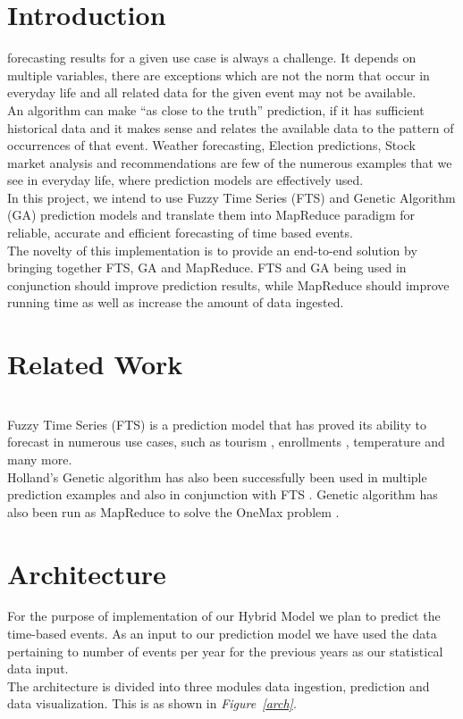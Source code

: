 \documentclass[12pt,journal,compsoc]{IEEEtran}
\begin{document}
\section{Introduction}
 forecasting results for a given use case is always a challenge. It depends on multiple variables, there are exceptions which are not the norm that occur in everyday life and all related data for the given event may not be available.
\\\indent An algorithm can make ``as close to the truth'' prediction, if it has sufficient historical data and  it makes sense and relates the available data to the pattern of occurrences of that event. Weather forecasting, Election predictions, Stock market analysis and recommendations are few of the numerous examples that we see in everyday life, where prediction models are effectively used.
\\\indent In this project, we intend to use Fuzzy Time Series (FTS) \cite{FTS} and Genetic Algorithm (GA) \cite{GA}  prediction models and translate them into MapReduce paradigm for reliable, accurate and efficient forecasting of time based events.  
\\\indent The novelty of this implementation is to provide an end-to-end solution by bringing together FTS, GA and MapReduce. FTS and GA being used in conjunction should improve prediction results, while MapReduce should improve running time as well as increase the amount of data ingested.


\section{Related Work}
\\\indent Fuzzy Time Series (FTS) \cite{FTS} is a prediction model that has proved its ability to forecast in numerous use cases, such as tourism \cite{FTS-tourism}, enrollments \cite{FTS-enroll}, temperature \cite{FTS-temperature} and many more.
\\\indent Holland's Genetic algorithm \cite{GA} has also been successfully been used in multiple prediction examples \cite{GA-bankruptcy,GA-electric,GAEB} and also in conjunction with FTS \cite{FTS-GA}. Genetic algorithm has also been run as MapReduce to solve the OneMax problem \cite{GA-mapreduce}.

\section{Architecture}
 \indent For the purpose of implementation of our Hybrid Model we plan to predict the time-based events. As an input to our prediction model we have used the data pertaining to number of events per year for the previous years as our statistical data input.
\\\indent The architecture is divided into three modules data ingestion, prediction and data visualization. This is as shown in \emph{Figure~\ref{arch}}. 
\end{document}

